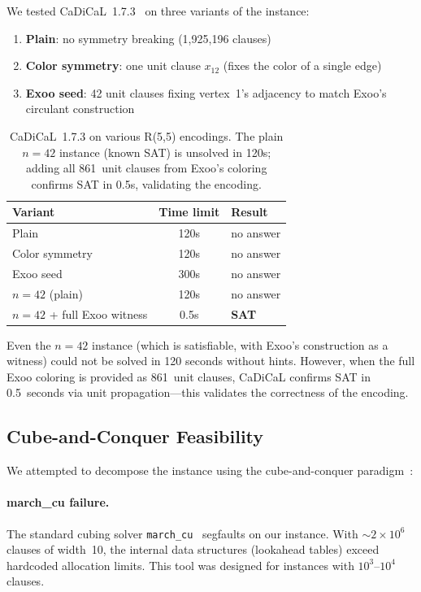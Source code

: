 \documentclass[11pt,a4paper]{article}
\theoremstyle{definition}
\theoremstyle{remark}
\begin{document}
We tested CaDiCaL~1.7.3~\cite{Biere2023cadical} on three
variants of the instance:
\begin{enumerate}
  \item \textbf{Plain}: no symmetry breaking (1,925,196 clauses)
  \item \textbf{Color symmetry}: one unit clause $x_{12}$
    (fixes the color of a single edge)
  \item \textbf{Exoo seed}: 42 unit clauses fixing vertex~1's
    adjacency to match Exoo's circulant construction
\end{enumerate}

\begin{table}[h]
\centering
\begin{tabular}{lcl}
\toprule
\textbf{Variant} & \textbf{Time limit} & \textbf{Result} \\
\midrule
Plain          & 120s & no answer \\
Color symmetry & 120s & no answer \\
Exoo seed      & 300s & no answer \\
$n=42$ (plain)   & 120s & no answer \\
$n=42$ + full Exoo witness & 0.5s & \textbf{SAT} \\
\bottomrule
\end{tabular}
\caption{CaDiCaL~1.7.3 on various R(5,5) encodings.
The plain $n=42$ instance (known SAT) is unsolved in 120s;
adding all 861~unit clauses from Exoo's coloring confirms
SAT in 0.5s, validating the encoding.}
\label{tab:sat}
\end{table}

Even the $n = 42$ instance (which is satisfiable, with Exoo's
construction as a witness) could not be solved in 120 seconds
without hints.  However, when the full Exoo coloring is provided
as 861~unit clauses, CaDiCaL confirms SAT in 0.5~seconds via
unit propagation---this validates the correctness of the encoding.

\subsection{Cube-and-Conquer Feasibility}

We attempted to decompose the instance using the cube-and-conquer
paradigm~\cite{HeuleCnC}:

\paragraph{march\_cu failure.}
The standard cubing solver \texttt{march\_cu}~\cite{HeuleCnC}
segfaults on our instance.  With $\sim\!2 \times 10^6$ clauses
of width~10, the internal data structures (lookahead tables)
exceed hardcoded allocation limits.  This tool was designed
for instances with $10^3$--$10^4$ clauses.
\end{document}
